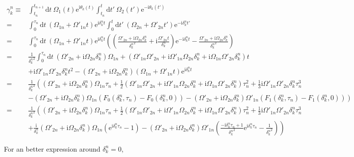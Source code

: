 \documentclass[10pt,fleqn]{article}
\newcommand{\ud}{\mathrm{d}}
\newcommand{\ue}{\mathrm{e}}
\newcommand{\ui}{\mathrm{i}}
\newcommand{\eqar}[1]
{
  \begin{align*}
    #1
  \end{align*}
}
\newcommand{\paren}[1]{{\left({#1}\right)}}
\newcommand{\lparen}[1]{{\left({#1}\right.}}
\newcommand{\rparen}[1]{{\left.{#1}\right)}}
\begin{document}
\eqar{
  \gamma_k^n\equiv&\int_{t_{n}}^{t_{n+1}}\!\!\ud t\ \Omega_1(t)\ue^{\ui\theta_{k}(t)}\int_{t_n}^{t}\!\!\ud t'\ \Omega_2(t')\ue^{-\ui\theta_{k}(t')}\\
  =&\int_{0}^{\tau_n}\!\!\ud t\ \paren{\Omega_{1n}+\Omega'_{1n}t}\ue^{\ui\delta_{k}^nt}\int_{0}^{t}\!\!\ud t'\ \paren{\Omega_{2n}+\Omega'_{2n}t'}\ue^{-\ui\delta_{k}^nt'}\\
  =&\int_{0}^{\tau_n}\!\!\ud t\ \paren{\Omega_{1n}+\Omega'_{1n}t}\ue^{\ui\delta_{k}^nt}
  \paren{\paren{\frac{\Omega'_{2n}+\ui\Omega_{2n}\delta_{k}^n}{{\delta_{k}^n}^2}+\ui\frac{\Omega'_{2n}t}{\delta_{k}^n}}\ue^{-\ui\delta_{k}^nt}-\frac{\Omega'_{2n}+\ui\Omega_{2n}\delta_{k}^n}{{\delta_{k}^n}^2}}\\
  =&\frac{1}{{\delta_{k}^n}^2}\int_{0}^{\tau_n}\!\!\ud t\ {}
  \paren{\Omega'_{2n}+\ui\Omega_{2n}\delta_{k}^n}\Omega_{1n}+
  \paren{\Omega'_{1n}\Omega'_{2n}+\ui\Omega'_{1n}\Omega_{2n}\delta_{k}^n
    +\ui\Omega_{1n}\Omega'_{2n}\delta_{k}^n}t\\
  &+\ui\Omega'_{1n}\Omega'_{2n}\delta_{k}^nt^2
  -\paren{\Omega'_{2n}+\ui\Omega_{2n}\delta_{k}^n}\paren{\Omega_{1n}+\Omega'_{1n}t}\ue^{\ui\delta_{k}^nt}\\
  =&\frac{1}{{\delta_k^n}^2}
  \lparen{
    \paren{\Omega'_{2n}+\ui\Omega_{2n}\delta_k^n}\Omega_{1n}\tau_n
    +\frac{1}{2}\paren{\Omega'_{1n}\Omega'_{2n}+\ui\Omega'_{1n}\Omega_{2n}\delta_{k}^n
    +\ui\Omega_{1n}\Omega'_{2n}\delta_{k}^n}\tau_n^2
    +\frac{1}{3}\ui\Omega'_{1n}\Omega'_{2n}\delta_k^n\tau_n^3}\\
  &\rparen{-\paren{\Omega'_{2n}+\ui\Omega_{2n}\delta_k^n}\Omega_{1n}\paren{F_0(\delta_k^n, \tau_n)-F_0(\delta_k^n, 0)}-\paren{\Omega'_{2n}+\ui\Omega_{2n}\delta_k^n}\Omega'_{1n}\paren{F_1(\delta_k^n, \tau_n)-F_1(\delta_k^n, 0)}}\\
  =&\frac{1}{{\delta_k^n}^2}
  \lparen{\paren{\Omega'_{2n}+\ui\Omega_{2n}\delta_k^n}\Omega_{1n}\tau_n
    +\frac{1}{2}\paren{\Omega'_{1n}\Omega'_{2n}+\ui\Omega'_{1n}\Omega_{2n}\delta_{k}^n
      +\ui\Omega_{1n}\Omega'_{2n}\delta_{k}^n}\tau_n^2
    +\frac{1}{3}\ui\Omega'_{1n}\Omega'_{2n}\delta_k^n\tau_n^3
  }\\
  &\rparen{+\frac{\ui}{{\delta_k^n}}\paren{\Omega'_{2n}+\ui\Omega_{2n}\delta_k^n}\Omega_{1n}\paren{\ue^{\ui{\delta_k^n}\tau_n}-1}
    -\paren{\Omega'_{2n}+\ui\Omega_{2n}\delta_k^n}\Omega'_{1n}
    \paren{\frac{-\ui{\delta_k^n}\tau_n + 1}{{\delta_k^n}^2}\ue^{\ui{\delta_k^n}\tau_n}
      -\frac{1}{{\delta_k^n}^2}}}
}
For an better expression around $\delta_k^n=0$,
\end{document}

